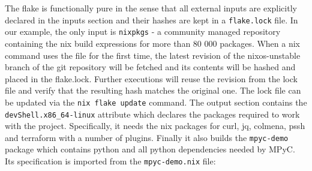 The flake is functionally pure in the sense that all external inputs are
explicitly declared in the inputs section and their hashes are kept in a
\texttt{flake.lock} file. In our example, the only input is
\texttt{nixpkgs} - a community managed repository containing the nix
build expressions for more than 80 000 packages. When a nix command uses
the file for the first time, the latest revision of the nixos-unstable
branch of the git repository will be fetched and its contents will be
hashed and placed in the flake.lock. Further executions will reuse the
revision from the lock file and verify that the resulting hash matches
the original one. The lock file can be updated via the
\texttt{nix\ flake\ update} command. The output section contains the
\texttt{devShell.x86\_64-linux} attribute which declares the packages
required to work with the project. Specifically, it needs the nix
packages for curl, jq, colmena, pssh and terraform with a number of
plugins. Finally it also builds the \texttt{mpyc-demo} package which
contains python and all python dependencies needed by MPyC. Its
specification is imported from the \texttt{mpyc-demo.nix} file:

\newpage

\begin{Shaded}
\begin{Highlighting}[]
\OperatorTok{\{} \OperatorTok{,}  \OperatorTok{\}}\NormalTok{:}
\OperatorTok{(}\OperatorTok{\{}
     \OperatorTok{=}\OperatorTok{;}
     \OperatorTok{=}\OperatorTok{;}

     \OperatorTok{=} \OperatorTok{(}\OperatorTok{:} \OperatorTok{[}
      \OperatorTok{(}
        \OperatorTok{\{}
           \OperatorTok{=} \OperatorTok{;}
           \OperatorTok{=}\OperatorTok{;}
        \OperatorTok{\})}
    \OperatorTok{]);}

     \OperatorTok{=}\OperatorTok{(}
      \OperatorTok{:} \OperatorTok{:} \OperatorTok{\{}
         \OperatorTok{=}\OperatorTok{;}
      \OperatorTok{\}}
    \OperatorTok{);}
  \OperatorTok{\})}
\end{Highlighting}
\end{Shaded}

